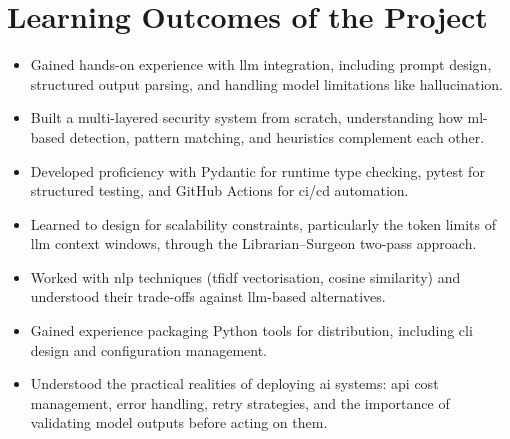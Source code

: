 \section{Learning Outcomes of the Project}
\begin{itemize}
\item Gained hands-on experience with \gls{llm} integration, including prompt design, structured output parsing, and handling model limitations like hallucination.
\item Built a multi-layered security system from scratch, understanding how \gls{ml}-based detection, pattern matching, and heuristics complement each other.
\item Developed proficiency with Pydantic for runtime type checking, pytest for structured testing, and GitHub Actions for \gls{ci}/\gls{cd} automation.
\item Learned to design for scalability constraints, particularly the token limits of \gls{llm} context windows, through the Librarian--Surgeon two-pass approach.
\item Worked with \gls{nlp} techniques (\gls{tfidf} vectorisation, cosine similarity) and understood their trade-offs against \gls{llm}-based alternatives.
\item Gained experience packaging Python tools for distribution, including \gls{cli} design and configuration management.
\item Understood the practical realities of deploying \gls{ai} systems: \gls{api} cost management, error handling, retry strategies, and the importance of validating model outputs before acting on them.
\end{itemize}
